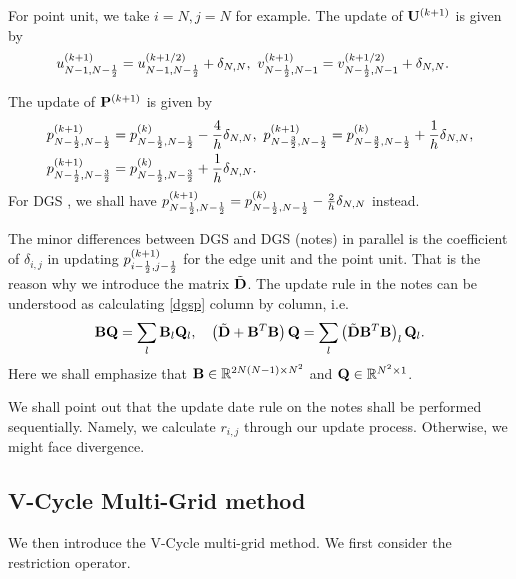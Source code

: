 \documentclass[english]{pkupaper}
\newenvironment{eqt}{\begin{equation}\begin{aligned}}{\end{aligned}\end{equation}}
\begin{document}
For point unit, we take $i=N, j=N$ for example. The update of  $\mathbf{U}^{(k+1)}$ is given by
\begin{eqt}
\label{upoint}
&u_{N-1,N-\oot}^{(k+1)}=u_{N-1,N-\oot}^{(k+1/2)}+\delta_{N,N}, \ v_{N-\oot,N-1}^{(k+1)}=v_{N-\oot,N-1}^{(k+1/2)}+\delta_{N,N}.
\end{eqt}

The update of $\mathbf{P}^{(k+1)}$ is given by
\begin{eqt}
&p_{N-\oot,N-\oot}^{(k+1)}=p_{N-\oot,N-\oot}^{(k)}-\frac{4}{h}\delta_{N,N}, \ p_{N-\frac{3}{2},N-\oot}^{(k+1)}=p_{N-\frac{3}{2},N-\oot}^{(k)}+\frac{1}{h}\delta_{N,N}, \\
& p_{N-\oot,N-\frac{3}{2}}^{(k+1)}=p_{N-\oot,N-\frac{3}{2}}^{(k)}+\frac{1}{h}\delta_{N,N}.
\end{eqt}
For DGS \cite{mmfts}, we shall have $p_{N-\frac{1}{2},N-\frac{1}{2}}^{(k+1)}=p_{N-\frac{1}{2},N-\frac{1}{2}}^{(k)}-\frac{2}{h}\delta_{N,N}$ instead.

The minor differences between DGS \cite{mmfts} and DGS (notes) in parallel is the coefficient of $\delta_{i,j}$ in updating $p_{i-\frac{1}{2},j-\frac{1}{2}}^{(k+1)}$ for the edge unit and the point unit. That is the reason why we introduce the matrix $\tilde {\mathbf{D}}$. The update rule in the notes can be understood as calculating \ref{dgsp} column by column, i.e.
\begin{equation}
\mathbf{B}\mathbf{Q}=\sum_l\mathbf{B}_l\mathbf{Q}_l, \quad \left(\tilde {\mathbf{D}}+\mathbf{B}^T\mathbf{B}\right)\mathbf{Q}=\sum_l\left(\tilde {\mathbf{D}} \mathbf{B}^T\mathbf{B}\right)_l\mathbf{Q}_l.
\end{equation} 
Here we shall emphasize that $\mathbf{B}\in\mathbb{R}^{2N(N-1)\times N^2}$ and $\mathbf{Q}\in \mathbb{R}^{N^2\times1}$.

We shall point out that the update date rule on the notes shall be performed sequentially. Namely, we calculate $r_{i,j}$ through our update process. Otherwise, we might face divergence.

\subsection{V-Cycle Multi-Grid method}
We then introduce the V-Cycle multi-grid method. We first consider the restriction operator. 
\end{document}
